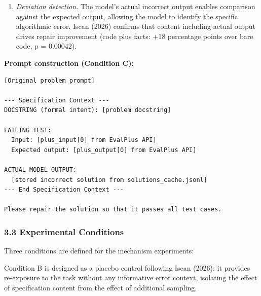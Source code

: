 \begin{enumerate}
\item \textit{Deviation detection.} The model's actual incorrect output enables comparison against the expected output, allowing the model to identify the specific algorithmic error. Iscan (2026) confirms that content including actual output drives repair improvement (code plus facts: +18 percentage points over bare code, p = 0.00042).
\end{enumerate}

\textbf{Prompt construction (Condition C):}

\begin{verbatim}
[Original problem prompt]

--- Specification Context ---
DOCSTRING (formal intent): [problem docstring]

FAILING TEST:
  Input: [plus_input[0] from EvalPlus API]
  Expected output: [plus_output[0] from EvalPlus API]

ACTUAL MODEL OUTPUT:
  [stored incorrect solution from solutions_cache.jsonl]
--- End Specification Context ---

Please repair the solution so that it passes all test cases.
\end{verbatim}

\subsubsection{3.3 Experimental Conditions}

Three conditions are defined for the mechanism experiments:

\begin{table}[htbp]
\centering
{}
\end{table}

Condition B is designed as a placebo control following Iscan (2026): it provides re-exposure to the task without any informative error context, isolating the effect of specification content from the effect of additional sampling.

